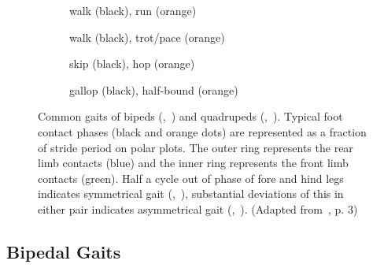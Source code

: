     \begin{figure}[htb]%
        \centering%
        \begin{subfigure}{0.45\linewidth}%
            \centering%
            
            \caption{walk (black), \textcolor{TUMOrange}{run (orange)}}
            \label{fig:walk-run}
        \end{subfigure}%
        \hfil%
        \begin{subfigure}{0.45\linewidth}%
            \centering%
            
            \caption{walk (black), \textcolor{TUMOrange}{trot/pace (orange)}}
            \label{fig:walk-trot}
        \end{subfigure}%
        \vfil%
         \begin{subfigure}{0.45\linewidth}%
            \centering%
            
            \caption{skip (black), \textcolor{TUMOrange}{hop (orange)}}
            \label{fig:skip-hop}
        \end{subfigure}%
        \hfil%
        \begin{subfigure}{0.45\linewidth}%
            \centering%
            
            \caption{gallop (black), \textcolor{TUMOrange}{half-bound (orange)}}
            \label{fig:gallop-half-bound}
        \end{subfigure}%
        \caption{Common gaits of bipeds (,~) and quadrupeds (,~). Typical foot contact phases (black and orange dots) are represented as a fraction of stride period on polar plots. The outer ring represents the rear limb contacts (blue) and the inner ring represents the front limb contacts (green). Half a cycle out of phase of fore and hind legs indicates symmetrical gait (,~), substantial deviations of this in either pair indicates asymmetrical gait (,~). (Adapted from~\cite{Lee2018}, p. 3)}%
        \label{fig:gaits}%
    \end{figure}%

    \subsection{Bipedal Gaits}


